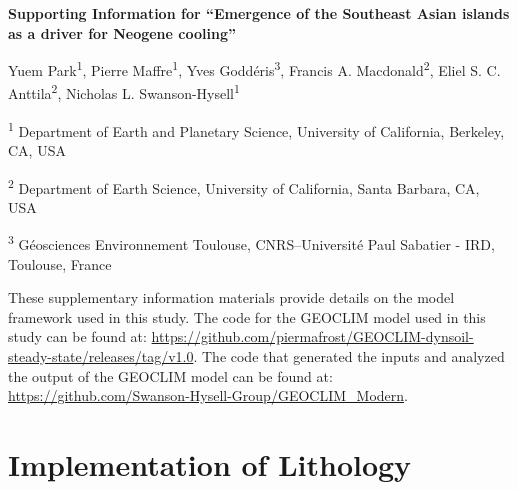 \documentclass[11pt,letterpaper]{article}
\begin{document}
\begin{flushleft}
{\Large \textbf{Supporting Information for ``Emergence of the Southeast Asian islands as a driver for Neogene cooling''}}

Yuem Park\textsuperscript{1},
Pierre Maffre\textsuperscript{1},
Yves Godd\'eris\textsuperscript{3},
Francis A. Macdonald\textsuperscript{2},
Eliel S. C. Anttila\textsuperscript{2},
Nicholas L. Swanson-Hysell\textsuperscript{1}

\bigskip
\textsuperscript{1} Department of Earth and Planetary Science, University of California, Berkeley, CA, USA

\textsuperscript{2} Department of Earth Science, University of California, Santa Barbara, CA, USA

\textsuperscript{3} G\'eosciences Environnement Toulouse, CNRS--Universit\'e Paul Sabatier - IRD, Toulouse, France

\bigskip

\end{flushleft}

\linenumbers

These supplementary information materials provide details on the model framework used in this study. The code for the GEOCLIM model used in this study can be found at: \url{https://github.com/piermafrost/GEOCLIM-dynsoil-steady-state/releases/tag/v1.0}. The code that generated the inputs and analyzed the output of the GEOCLIM model can be found at: \url{https://github.com/Swanson-Hysell-Group/GEOCLIM_Modern}.

\section*{Implementation of Lithology}
\end{document}
